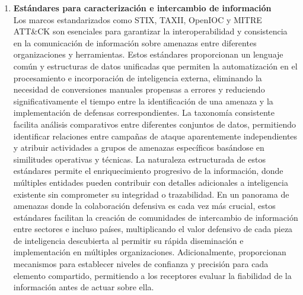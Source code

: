 \begin{enumerate}
\item \textbf{Estándares para caracterización e intercambio de información} \\
Los marcos estandarizados como STIX, TAXII, OpenIOC y MITRE ATT\&CK son esenciales para garantizar la interoperabilidad y consistencia en la comunicación de información sobre amenazas entre diferentes organizaciones y herramientas. Estos estándares proporcionan un lenguaje común y estructuras de datos unificadas que permiten la automatización en el procesamiento e incorporación de inteligencia externa, eliminando la necesidad de conversiones manuales propensas a errores y reduciendo significativamente el tiempo entre la identificación de una amenaza y la implementación de defensas correspondientes. La taxonomía consistente facilita análisis comparativos entre diferentes conjuntos de datos, permitiendo identificar relaciones entre campañas de ataque aparentemente independientes y atribuir actividades a grupos de amenazas específicos basándose en similitudes operativas y técnicas. La naturaleza estructurada de estos estándares permite el enriquecimiento progresivo de la información, donde múltiples entidades pueden contribuir con detalles adicionales a inteligencia existente sin comprometer su integridad o trazabilidad. En un panorama de amenazas donde la colaboración defensiva es cada vez más crucial, estos estándares facilitan la creación de comunidades de intercambio de información entre sectores e incluso países, multiplicando el valor defensivo de cada pieza de inteligencia descubierta al permitir su rápida diseminación e implementación en múltiples organizaciones. Adicionalmente, proporcionan mecanismos para establecer niveles de confianza y precisión para cada elemento compartido, permitiendo a los receptores evaluar la fiabilidad de la información antes de actuar sobre ella.
\end{enumerate}